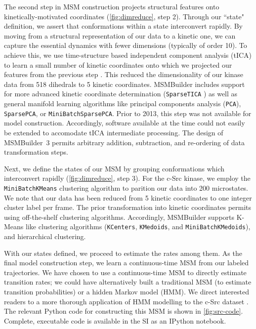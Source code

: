 The second step in MSM construction projects structural features onto
kinetically-motivated coordinates (\cref{fig:dimreduce}, step 2).  Through
our ``state" definition, we assert that conformations within a state
interconvert rapidly. By moving from a structural representation of our
data to a kinetic one, we can capture the essential dynamics with fewer
dimensions (typically of order 10).  To achieve this, we use
time-structure based independent
component analysis (tICA) to learn a small number of kinetic coordinates
onto which we projected our features from the previous step
\cite{2013-schwantes-tica, 2013-noe-tica}. This reduced the dimensionality
of our kinase data from 518 dihedrals to 5 kinetic coordinates.  MSMBuilder
includes support for more advanced kinetic coordinate determination
(\texttt{SparseTICA} \cite{2016-sparsetica}) as well as general manifold
learning algorithms like principal components analysis (\texttt{PCA}),
\texttt{SparsePCA}, or \texttt{MiniBatchSparsePCA}. Prior to 2013, this
step was not available for model construction. Accordingly, software
available at the time could not easily be extended to accomodate tICA
intermediate processing. The design of MSMBuilder~3 permits arbitrary
addition, subtraction, and re-ordering of data transformation steps.

Next, we define the states of our MSM by grouping conformations which
interconvert rapidly (\cref{fig:dimreduce}, step 3). For the c-Src kinase,
we employ the \texttt{MiniBatchKMeans} \cite{2010-minibatch-kmeans}
clustering algorithm to parition our data into 200 microstates. We note
that our data has been reduced from 5 kinetic
coordinates to one integer cluster label per frame. 
The prior transformation into kinetic
coordinates permits using off-the-shelf clustering algorithms. Accordingly,
MSMBuilder supports K-Means like clustering algorithms (\texttt{KCenters},
\texttt{KMedoids}, and  \texttt{MiniBatchKMedoids}), and hierarchical clustering.

With our states defined, we proceed to estimate the rates among them. As
the final model construction step, we learn a continuous-time MSM
\cite{2015-ratematrix} from our labeled trajectories. We have chosen to use
a continuous-time MSM to directly estimate transition rates; we could have
alternatively built a traditional MSM (to estimate transition
probabilities) or a hidden Markov model (HMM). We direct interested readers
to a more thorough application of HMM modelling to the c-Src dataset
\cite{2014-hmm}. The relevant Python code for constructing this MSM is
shown in \cref{fig:src-code}. Complete, executable code is available in the
SI as an IPython \cite{2007-ipython} notebook.

